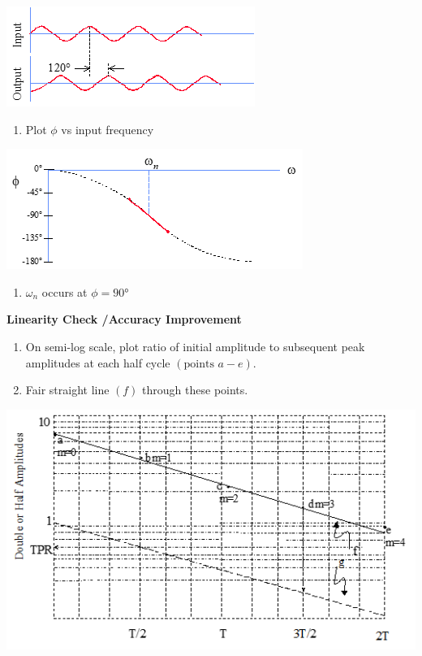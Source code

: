 \documentclass[
]{book}
\providecommand{\tightlist}{%
  \setlength{\itemsep}{0pt}\setlength{\parskip}{0pt}}
\begin{document}
\includegraphics{media/08/image97.png}

\begin{enumerate}
\def\labelenumi{\arabic{enumi}.}
\setcounter{enumi}{4}
\tightlist
\item
  Plot \(\phi\) vs input frequency
\end{enumerate}

\includegraphics{media/08/image98.png}

\begin{enumerate}
\def\labelenumi{\arabic{enumi}.}
\setcounter{enumi}{5}
\tightlist
\item
  \(\omega_n\) occurs at \(\phi = 90°\)
\end{enumerate}

\textbf{Linearity Check /Accuracy Improvement}

\begin{enumerate}
\def\labelenumi{\arabic{enumi}.}
\tightlist
\item
  On semi-log scale, plot ratio of initial amplitude to subsequent peak amplitudes at each half cycle \(\left( \text{points } a-e \right)\).
\item
  Fair straight line \(\left( f \right)\) through these points.
\end{enumerate}

\includegraphics{media/08/image99.png}
\end{document}

